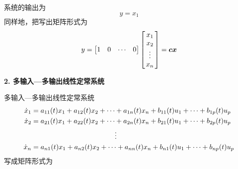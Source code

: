 系统的输出为
\begin{equation}
	y = x_1
\end{equation}
同样地，把写出矩阵形式为
\begin{equation}
	y = 
	\begin{bmatrix}
		1&0&\cdots & 0 
	\end{bmatrix}
	\begin{bmatrix}
		x_1\\
		x_2\\
		\hspace*{2mm}\vdots\hspace*{2mm}\\
		x_n
	\end{bmatrix} = \bm{c}\bm{x}
\end{equation}

\noindent \textbf{2. 多输入—多输出线性定常系统}

多输入—多输出线性定常系统
\begin{equation}
	\begin{aligned}
		\dot{x}_1 &= a_{11}(t)x_1 + a_{12}(t)x_2 + \cdots + a_{1n}(t)x_n + b_{11}(t)u_1 + \cdots + b_{1p}(t)u_p\\
		\dot{x}_2 &= a_{21}(t)x_1 + a_{22}(t)x_2 + \cdots + a_{2n}(t)x_n + b_{21}(t)u_1 + \cdots + b_{2p}(t)u_p\\
		& \hspace*{12em}\vdots \\
		\dot{x}_n &= a_{n1}(t)x_1 + a_{n2}(t)x_2 + \cdots + a_{nn}(t)x_n + b_{n1}(t)u_1 + \cdots + b_{np}(t)u_p
	\end{aligned}
\end{equation}
写成矩阵形式为

